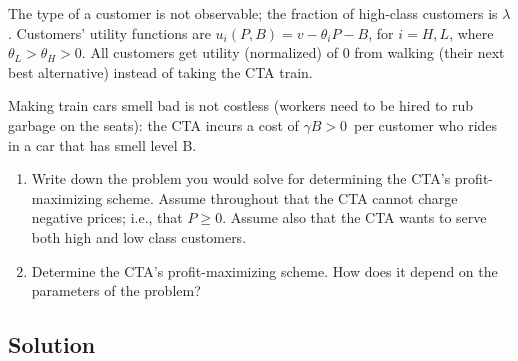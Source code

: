 \documentclass[a4paper]{article}
\newif\ifsolutions
\begin{document}
The type of a customer is not observable; the fraction of high-class
customers is $\lambda $. Customers' utility functions are $%
u_{i}(P,B)=v-\theta _{i}P-B$, for $i=H,L$, where $\theta
_{L}>\theta _{H}>0$. All customers get utility (normalized) of 0 from
walking (their next best alternative) instead of taking the CTA train.

Making train cars smell bad is not costless (workers need to be hired
to rub garbage on the seats): the CTA incurs a cost of $\gamma B>0$\
per customer who rides in a car that has smell level B.

\begin{enumerate}
	\item Write down the problem you would solve for determining the CTA's
		profit-maximizing scheme. Assume throughout that the CTA cannot charge
		negative prices; i.e., that $P\geq 0$. Assume also that the CTA wants
		to serve both high and low class customers.
	
	\item Determine the CTA's profit-maximizing scheme. How does it depend
		on the parameters of the problem?
\end{enumerate}

\ifsolutions
\subsection*{Solution}
\end{document}
